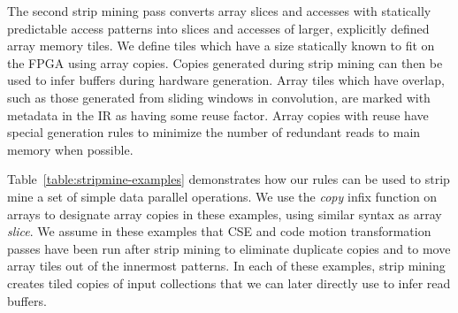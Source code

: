 \documentclass[pageno]{jpaper}
\begin{document}
The second strip mining pass converts array slices and accesses with statically predictable access patterns into slices and accesses of larger, explicitly defined
array memory tiles. We define tiles which have a size statically known to fit on the FPGA using array copies.
Copies generated during strip mining can then be used to infer buffers during hardware generation.
Array tiles which have overlap, such as those generated from sliding windows in convolution, are marked with metadata in the IR as having some reuse factor.
Array copies with reuse have special generation rules to minimize the number of redundant reads to main memory when possible.

Table~\ref{table:stripmine-examples} demonstrates how our rules can be used to strip mine a set of simple data parallel operations.
We use the \emph{copy} infix function on arrays to designate array copies in these examples, using similar syntax as array \emph{slice}.
We assume in these examples that CSE and code motion transformation passes have been run after strip mining to eliminate duplicate copies and to
move array tiles out of the innermost patterns. In each of these examples, strip mining creates tiled copies of input collections that
we can later directly use to infer read buffers.

\begin{comment}
\begin{table*}[t]\small\centering
\begin{tabular}{@{}lll@{}}
\toprule
{\bf Nested Pattern }    & { }  & {\bf Interchanged Patterns} \\ \midrule
{\begin{lstlisting}[mathescape=true,numbers=none]
Map(d){i =>
  MultiFold(d/b)(1)(z)(f)(c)
}
\end{lstlisting}
} & \texttt{=>} &
{\begin{lstlisting}[mathescape=true,numbers=none]
MultiFold(d/b)(1)(Map(d)(z))(
  (0, acc => Map(d){i => c(acc(i), f._2) })
){(a,b) => Map(d){i => c(a(i), b(i)) }}
\end{lstlisting}
} \\ \midrule
{\begin{lstlisting}[mathescape=true,numbers=none]
MultiFold(d)(d)(z)(
  x = MultiFold(d/b)(d)(zeros(d))(f)(_)
  (0, acc => MultiFold(d/b)(d)(zeros(d))(c(acc,x))(_))
){(a,b) =>
  MultiFold(d/b)(d)(zeros(d))(c(a,b))(_)
}
\end{lstlisting}
} & \texttt{=>} &
{\begin{lstlisting}[mathescape=true,numbers=none]
MultiFold(d/b)(d)(zeros(d))(
  (0, acc => MultiFold(d)(1)(z)(f)(c) )
)(_)
\end{lstlisting}
} \\ \bottomrule
\end{tabular}
\caption{Interchange transformation rules for pattern tiling.}
\label{table:interchange}
\end{table*}
\end{comment}
\end{document}
